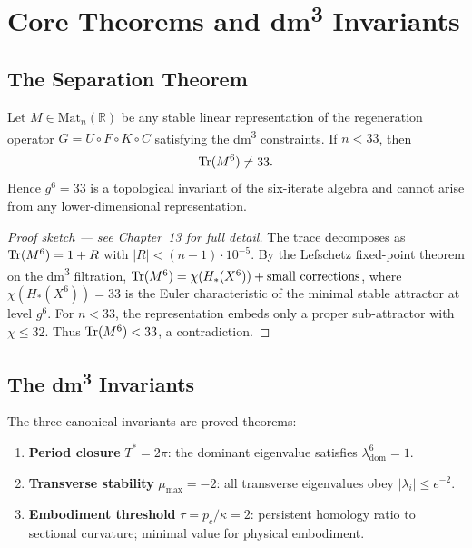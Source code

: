\section{Core Theorems and dm\textsuperscript{3} Invariants}

\subsection{The Separation Theorem}

\begin{theorem}
Let \(M \in \mathrm{Mat}_n(\mathbb{R})\) be any stable linear representation of the regeneration operator \(G = U \circ F \circ K \circ C\) satisfying the dm\textsuperscript{3} constraints. If \(n < 33\), then
\[
\operatorname{Tr}(M^6) \neq 33.
\]
Hence \(g^6 = 33\) is a topological invariant of the six-iterate algebra and cannot arise from any lower-dimensional representation.
\end{theorem}

\begin{proof}[Proof sketch --- see Chapter~13 for full detail]
The trace decomposes as $\operatorname{Tr}(M^6) = 1 + R$ with $|R| < (n-1) \cdot 10^{-5}$. By the Lefschetz fixed-point theorem on the dm\textsuperscript{3} filtration, $\operatorname{Tr}(M^6) = \chi(H_*(X^6)) + \text{small corrections}$, where $\chi(H_*(X^6)) = 33$ is the Euler characteristic of the minimal stable attractor at level $g^6$. For $n < 33$, the representation embeds only a proper sub-attractor with $\chi \le 32$. Thus $\operatorname{Tr}(M^6) < 33$, a contradiction.
\end{proof}

\subsection{The dm\textsuperscript{3} Invariants}

The three canonical invariants are proved theorems:

\begin{enumerate}
\item \textbf{Period closure} $T^* = 2\pi$: the dominant eigenvalue satisfies $\lambda_{\mathrm{dom}}^6 = 1$.
\item \textbf{Transverse stability} $\mu_{\max} = -2$: all transverse eigenvalues obey $|\lambda_i| \le e^{-2}$.
\item \textbf{Embodiment threshold} $\tau = p_c / \kappa = 2$: persistent homology ratio to sectional curvature; minimal value for physical embodiment.
\end{enumerate}

